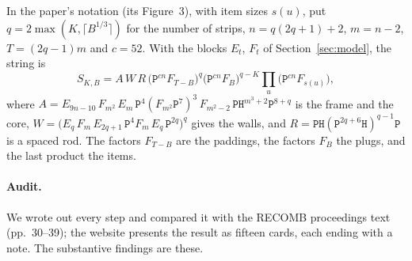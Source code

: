 \documentclass[11pt,letterpaper]{article}
\theoremstyle{definition}
\theoremstyle{remark}
\newcommand{\Hh}{\mathtt{H}}
\newcommand{\Pp}{\mathtt{P}}
\begin{document}
In the paper's notation (its Figure~3), with item sizes $s(u)$, put $q=2\max(K,\lceil
B^{1/3}\rceil)$ for the number of strips, $n=q(2q+1)+2$, $m=n-2$, $T=(2q-1)m$ and $c=52$. With the
blocks $E_t$, $F_t$ of Section~\ref{sec:model}, the string is
\[
S_{K,B}=A\,W\,R\,\bigl(\Pp^{cn}F_{T-B}\bigr)^{q}\bigl(\Pp^{cn}F_B\bigr)^{q-K}\prod_u\bigl(\Pp^{cn}F_{s(u)}\bigr),
\]
where $A=E_{9n-10}\,F_{m^2}\,E_m\,\Pp^4(F_{m^2}\Pp^7)^3\,F_{m^2-2}\,\Pp\Hh^{m^3+2}\Pp^{8+q}$ is the frame
and the core, $W=\bigl(E_q\,F_m\,E_{2q+1}\,\Pp^4F_m\,E_q\,\Pp^{2q}\bigr)^q$ gives the walls, and
$R=\Pp\Hh(\Pp^{2q+6}\Hh)^{q-1}\Pp$ is a spaced rod. The factors $F_{T-B}$ are the paddings, the
factors $F_B$ the plugs, and the last product the items.

\paragraph{Audit.}
We wrote out every step and compared it with the RECOMB proceedings text (pp.~30--39); the website
presents the result as fifteen cards, each ending with a note. The substantive findings are these.
\end{document}
